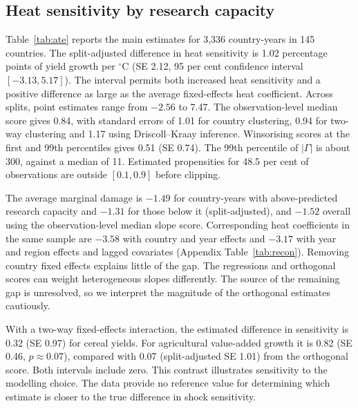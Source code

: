 \subsection{Heat sensitivity by research capacity}

Table~\ref{tab:ate} reports the main estimates for 3,336 country-years in 145 countries.
The split-adjusted difference in heat sensitivity is 1.02 percentage points of yield
growth per $^{\circ}$C (SE 2.12, 95 per cent confidence interval $[-3.13,5.17]$).
The interval permits both increased heat sensitivity and a positive difference as
large as the average fixed-effects heat coefficient. Across splits, point estimates
range from $-2.56$ to 7.47. The observation-level median score gives 0.84, with standard
errors of 1.01 for country clustering, 0.94 for two-way clustering and 1.17 using
Driscoll--Kraay inference. Winsorising scores at the first and 99th percentiles gives
0.51 (SE 0.74). The 99th percentile of $|\Gamma|$ is about 300, against a median of 11.
Estimated propensities for 48.5 per cent of observations are outside $[0.1,0.9]$
before clipping.

The average marginal damage is $-1.49$ for country-years with above-predicted research
capacity and $-1.31$ for those below it (split-adjusted), and $-1.52$ overall using
the observation-level median slope score. Corresponding heat coefficients in the same
sample are $-3.58$ with country and year effects and $-3.17$ with year and region
effects and lagged covariates (Appendix Table~\ref{tab:recon}). Removing country fixed
effects explains little of the gap. The regressions and orthogonal scores can weight
heterogeneous slopes differently. The source of the remaining gap is unresolved, so
we interpret the magnitude of the orthogonal estimates cautiously.

With a two-way fixed-effects interaction, the estimated difference in sensitivity is
0.32 (SE 0.97) for cereal yields. For agricultural value-added growth it is 0.82
(SE 0.46, $p\approx0.07$), compared with 0.07 (split-adjusted SE 1.01) from the
orthogonal score. Both intervals include zero. This contrast illustrates sensitivity
to the modelling choice. The data provide no reference value for determining which
estimate is closer to the true difference in shock sensitivity.

